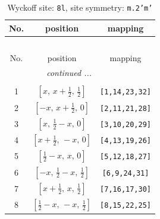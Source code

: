 \documentclass[fleqn,8pt]{jsarticle}
\begin{document}
\begin{longtable}{ccc}
\caption{Wyckoff site: {\tt 8l}, site symmetry: {\tt m.2'm'}}
 \\
 \hline \hline
No. & position & mapping \\ \hline \endfirsthead

\multicolumn{2}{l}{\tablename\ \thetable{}} \\
 \hline \hline
No. & position & mapping \\ \hline \endhead

 \hline \hline
\multicolumn{2}{r}{\footnotesize\it continued ...} \\ \endfoot

 \hline \hline
\multicolumn{2}{r}{} \\ \endlastfoot

1 & $\left[ x,\, x + \frac{1}{2},\, \frac{1}{2} \right]$ & {\tt [1,14,23,32]} \\ \hline
2 & $\left[ - x,\, x + \frac{1}{2},\, 0 \right]$ & {\tt [2,11,21,28]} \\ \hline
3 & $\left[ x,\, \frac{1}{2} - x,\, 0 \right]$ & {\tt [3,10,20,29]} \\ \hline
4 & $\left[ x + \frac{1}{2},\, - x,\, 0 \right]$ & {\tt [4,13,19,26]} \\ \hline
5 & $\left[ \frac{1}{2} - x,\, x,\, 0 \right]$ & {\tt [5,12,18,27]} \\ \hline
6 & $\left[ - x,\, \frac{1}{2} - x,\, \frac{1}{2} \right]$ & {\tt [6,9,24,31]} \\ \hline
7 & $\left[ x + \frac{1}{2},\, x,\, \frac{1}{2} \right]$ & {\tt [7,16,17,30]} \\ \hline
8 & $\left[ \frac{1}{2} - x,\, - x,\, \frac{1}{2} \right]$ & {\tt [8,15,22,25]} \\
\end{longtable}
\renewcommand{\arraystretch}{1.2}
\end{document}
